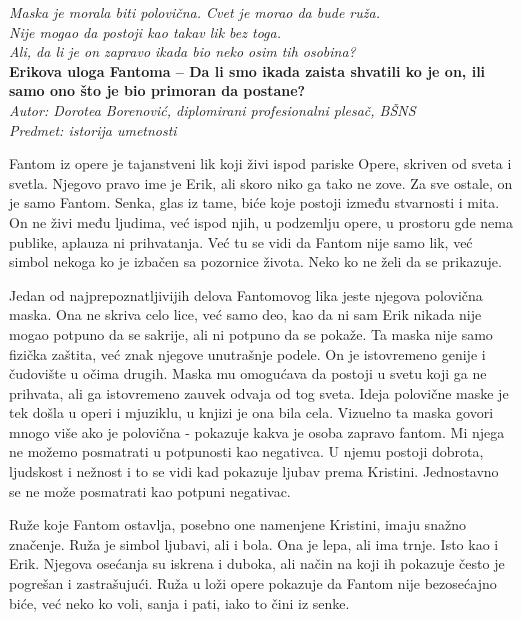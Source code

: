 \documentclass[12pt]{article}
\begin{document}
\begin{center}
    \textit{Maska je morala biti polovična. Cvet je morao da bude ruža.}\\
    \textit{Nije mogao da postoji kao takav lik bez toga.}\\
    \textit{Ali, da li je on zapravo ikada bio neko osim tih osobina?}\\[0.5cm]

    {\Large \textbf{Erikova uloga Fantoma -- Da li smo ikada zaista shvatili ko je on, ili samo ono što je bio primoran da postane?}} \\[0.4cm]

    {\small \textit{Autor: Dorotea Borenović, diplomirani profesionalni plesač, BŠNS}} \\
    {\small \textit{Predmet: istorija umetnosti}}
\end{center}

\vspace{0.8cm}

Fantom iz opere je tajanstveni lik koji živi ispod pariske Opere, skriven od sveta i svetla. Njegovo pravo ime je Erik, ali skoro niko ga tako ne zove. Za sve ostale, on je samo Fantom. Senka, glas iz tame, biće koje postoji između stvarnosti i mita. On ne živi među ljudima, već ispod njih, u podzemlju opere, u prostoru gde nema publike, aplauza ni prihvatanja. Već tu se vidi da Fantom nije samo lik, već simbol nekoga ko je izbačen sa pozornice života. Neko ko ne želi da se prikazuje. 

Jedan od najprepoznatljivijih delova Fantomovog lika jeste njegova polovična maska. Ona ne skriva celo lice, već samo deo, kao da ni sam Erik nikada nije mogao potpuno da se sakrije, ali ni potpuno da se pokaže. Ta maska nije samo fizička zaštita, već znak njegove unutrašnje podele. On je istovremeno genije i čudovište u očima drugih. Maska mu omogućava da postoji u svetu koji ga ne prihvata, ali ga istovremeno zauvek odvaja od tog sveta. Ideja polovične maske je tek došla u operi i mjuziklu, u knjizi je ona bila cela. Vizuelno ta maska govori mnogo više ako je polovična - pokazuje kakva je osoba zapravo fantom. Mi njega ne možemo posmatrati u potpunosti kao negativca. U njemu postoji dobrota, ljudskost i nežnost i to se vidi kad pokazuje ljubav prema Kristini. Jednostavno se ne može posmatrati kao potpuni negativac.

Ruže koje Fantom ostavlja, posebno one namenjene Kristini, imaju snažno značenje. Ruža je simbol ljubavi, ali i bola. Ona je lepa, ali ima trnje. Isto kao i Erik. Njegova osećanja su iskrena i duboka, ali način na koji ih pokazuje često je pogrešan i zastrašujući. Ruža u loži opere pokazuje da Fantom nije bezosećajno biće, već neko ko voli, sanja i pati, iako to čini iz senke.
\end{document}

